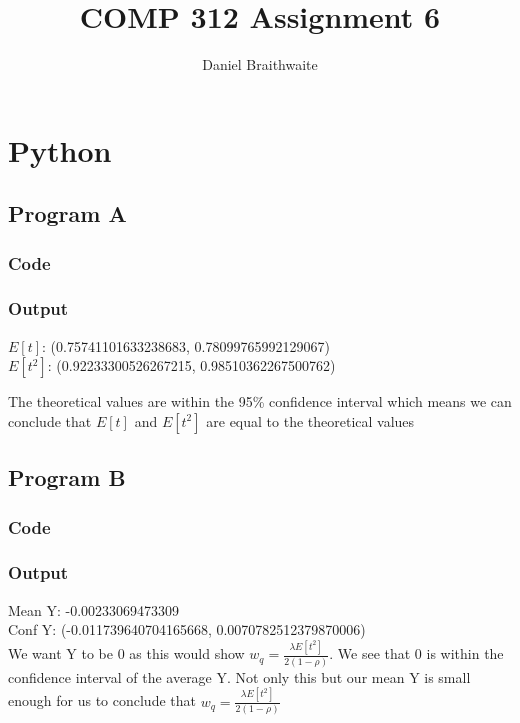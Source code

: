 \documentclass{article}
\title{COMP 312 Assignment 6}
\author{Daniel Braithwaite}
\begin{document}
	\maketitle
	\newpage
  	
  	\section{Python}
  		\subsection{Program A}
			\subsubsection{Code}
				
			\subsubsection{Output}
				$E[t]$: (0.75741101633238683, 0.78099765992129067)\\
$E[t^2]$: (0.92233300526267215, 0.98510362267500762)

			The theoretical values are within the 95\% confidence interval which means we can conclude that $E[t]$ and $E[t^2]$ are equal to the theoretical values

  		
  		
  		\subsection{Program B}
  			\subsubsection{Code}
				
			\subsubsection{Output}
				Mean Y: -0.00233069473309\\
Conf Y: (-0.011739640704165668, 0.0070782512379870006)\\

				We want Y to be 0 as this would show $w_q = \frac{\lambda E[t^2]}{2(1-\rho)}$. We see that 0 is within the confidence interval of the average Y. Not only this but our mean Y is small enough for us to conclude that $w_q = \frac{\lambda E[t^2]}{2(1-\rho)}$
\end{document}
